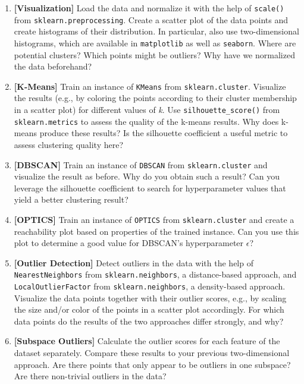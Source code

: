 \documentclass[12pt]{article}
\newcommand{\code}[1]{\textcolor{kitgreen}{\texttt{#1}}}
\newcommand{\taskname}[1]{\textcolor{kitblue}{\textbf{[#1]}}}
\begin{document}
\begin{enumerate}[label=\alph*), left=0pt, itemsep=12pt]
	\item
	\taskname{Visualization}
	Load the data and normalize it with the help of \code{scale()} from \code{sklearn.preprocessing}.
	Create a scatter plot of the data points and create histograms of their distribution.
	In particular, also use two-dimensional histograms, which are available in \code{matplotlib} as well as \code{seaborn}.
	\newline
	Where are potential clusters?
	Which points might be outliers?
	Why have we normalized the data beforehand?
	\item
	\taskname{K-Means}
	Train an instance of \code{KMeans} from \code{sklearn.cluster}.
	Visualize the results (e.g., by coloring the points according to their cluster membership in a scatter plot) for different values of \textit{k}.
	Use \code{silhouette\_score()} from \code{sklearn.metrics} to assess the quality of the k-means results.
	\newline
	Why does k-means produce these results?
	Is the silhouette coefficient a useful metric to assess clustering quality here?
	\item
	\taskname{DBSCAN}
	Train an instance of \code{DBSCAN} from \code{sklearn.cluster} and visualize the result as before.
	\newline
	Why do you obtain such a result?
	Can you leverage the silhouette coefficient to search for hyperparameter values that yield a better clustering result?
	\item
	\taskname{OPTICS}
	Train an instance of \code{OPTICS} from \code{sklearn.cluster} and create a reachability plot based on properties of the trained instance.
	\newline
	Can you use this plot to determine a good value for DBSCAN's hyperparameter $\epsilon$?
	\item
	\taskname{Outlier Detection}
	Detect outliers in the data with the help of \code{NearestNeighbors} from \code{sklearn.neighbors}, a distance-based approach, and \code{LocalOutlierFactor} from \code{sklearn.neighbors}, a density-based approach.
	Visualize the data points together with their outlier scores, e.g., by scaling the size and/or color of the points in a scatter plot accordingly.
	\newline
	For which data points do the results of the two approaches differ strongly, and why?
	\item
	\taskname{Subspace Outliers}
	Calculate the outlier scores for each feature of the dataset separately.
	Compare these results to your previous two-dimensional approach.
	\newline
	Are there points that only appear to be outliers in one subspace?
	Are there non-trivial outliers in the data?
\end{enumerate}
\end{document}
